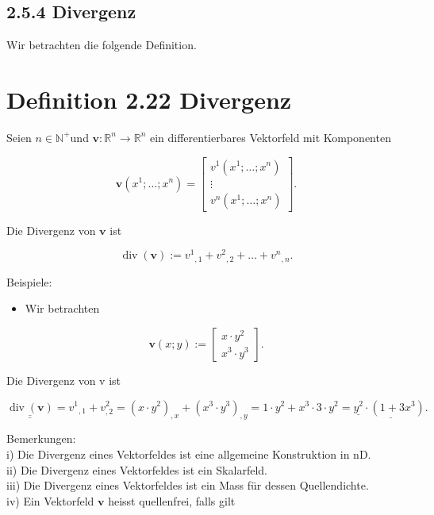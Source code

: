 \documentclass[10pt]{article}
\begin{document}
\subsection*{2.5.4 Divergenz}
Wir betrachten die folgende Definition.

\section*{Definition 2.22 Divergenz}
Seien $n \in \mathbb{N}^{+}$und $\mathbf{v}: \mathbb{R}^{n} \rightarrow \mathbb{R}^{n}$ ein differentierbares Vektorfeld mit Komponenten

\[
\mathbf{v}\left(x^{1} ; \ldots ; x^{n}\right)=\left[\begin{array}{c}
v^{1}\left(x^{1} ; \ldots ; x^{n}\right)  \tag{2.149}\\
\vdots \\
v^{n}\left(x^{1} ; \ldots ; x^{n}\right)
\end{array}\right] .
\]

Die Divergenz von $\mathbf{v}$ ist


\begin{equation*}
\operatorname{div}(\mathbf{v}):=v^{1}{ }_{, 1}+v^{2}{ }_{, 2}+\ldots+v^{n}{ }_{, n} . \tag{2.150}
\end{equation*}


Beispiele:

\begin{itemize}
  \item Wir betrachten
\end{itemize}

\[
\mathbf{v}(x ; y):=\left[\begin{array}{l}
x \cdot y^{2}  \tag{2.151}\\
x^{3} \cdot y^{3}
\end{array}\right] .
\]

Die Divergenz von v ist


\begin{equation*}
\underline{\underline{\operatorname{div}(\mathbf{v})}}=v^{1}{ }_{, 1}+v_{, 2}^{2}=\left(x \cdot y^{2}\right)_{, x}+\left(x^{3} \cdot y^{3}\right)_{, y}=1 \cdot y^{2}+x^{3} \cdot 3 \cdot y^{2}=\underline{\underline{y^{2}} \cdot\left(1+3 x^{3}\right) .} \tag{2.152}
\end{equation*}


Bemerkungen:\\
i) Die Divergenz eines Vektorfeldes ist eine allgemeine Konstruktion in nD.\\
ii) Die Divergenz eines Vektorfeldes ist ein Skalarfeld.\\
iii) Die Divergenz eines Vektorfeldes ist ein Mass für dessen Quellendichte.\\
iv) Ein Vektorfeld $\mathbf{v}$ heisst quellenfrei, falls gilt
\end{document}

